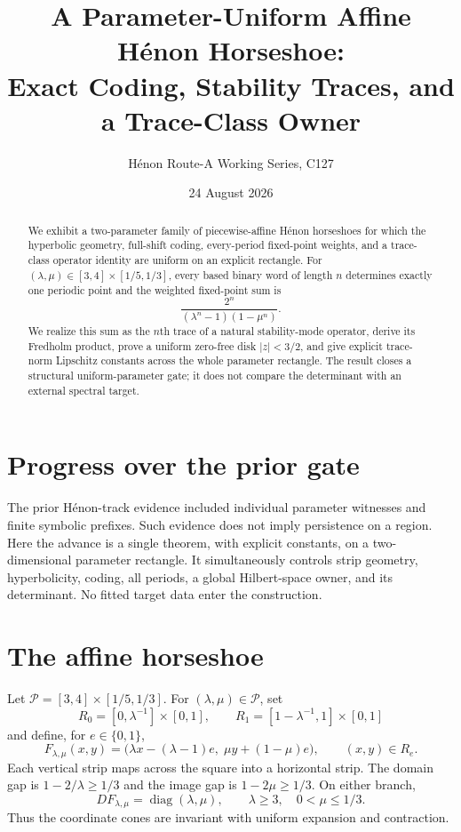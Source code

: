 \documentclass[11pt]{article}
\title{A Parameter-Uniform Affine H\'enon Horseshoe:\\
Exact Coding, Stability Traces, and a Trace-Class Owner}
\author{H\'enon Route-A Working Series, C127}
\date{24 August 2026}
\begin{document}
\maketitle

\begin{abstract}
We exhibit a two-parameter family of piecewise-affine H\'enon horseshoes for
which the hyperbolic geometry, full-shift coding, every-period fixed-point
weights, and a trace-class operator identity are uniform on an explicit
rectangle.  For $(\lambda,\mu)\in[3,4]\times[1/5,1/3]$, every based binary
word of length $n$ determines exactly one periodic point and the weighted
fixed-point sum is
\[
 \frac{2^n}{(\lambda^n-1)(1-\mu^n)}.
\]
We realize this sum as the $n$th trace of a natural stability-mode operator,
derive its Fredholm product, prove a uniform zero-free disk $|z|<3/2$, and
give explicit trace-norm Lipschitz constants across the whole parameter
rectangle.  The result closes a structural uniform-parameter gate; it does
not compare the determinant with an external spectral target.
\end{abstract}

\section{Progress over the prior gate}

The prior H\'enon-track evidence included individual parameter witnesses and
finite symbolic prefixes.  Such evidence does not imply persistence on a
region.  Here the advance is a single theorem, with explicit constants, on a
two-dimensional parameter rectangle.  It simultaneously controls strip
geometry, hyperbolicity, coding, all periods, a global Hilbert-space owner,
and its determinant.  No fitted target data enter the construction.

\section{The affine horseshoe}

Let $\mathcal P=[3,4]\times[1/5,1/3]$.  For
$(\lambda,\mu)\in\mathcal P$, set
\[
 R_0=[0,\lambda^{-1}]\times[0,1],\qquad
 R_1=[1-\lambda^{-1},1]\times[0,1]
\]
and define, for $e\in\{0,1\}$,
\begin{equation}\label{eq:map}
 F_{\lambda,\mu}(x,y)=
 \bigl(\lambda x-(\lambda-1)e,\;\mu y+(1-\mu)e\bigr),
 \qquad (x,y)\in R_e.
\end{equation}
Each vertical strip maps across the square into a horizontal strip.  The
domain gap is $1-2/\lambda\ge1/3$ and the image gap is
$1-2\mu\ge1/3$.  On either branch,
\[
 DF_{\lambda,\mu}=\operatorname{diag}(\lambda,\mu),
 \qquad \lambda\ge3,\quad 0<\mu\le1/3.
\]
Thus the coordinate cones are invariant with uniform expansion and
contraction.
\end{document}
